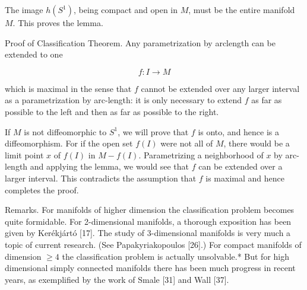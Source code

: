 \documentclass[10pt, letterpaper]{article}
\begin{document}
The image $h\left(S^{1}\right)$, being compact and open in $M$, must be the entire manifold $M$. This proves the lemma.

Proof of Classification Theorem. Any parametrization by arclength can be extended to one

$$
f: I \rightarrow M
$$

which is maximal in the sense that $f$ cannot be extended over any larger interval as a parametrization by arc-length: it is only necessary to extend $f$ as far as possible to the left and then as far as possible to the right.

If $M$ is not diffeomorphic to $S^{1}$, we will prove that $f$ is onto, and hence is a diffeomorphism. For if the open set $f(I)$ were not all of $M$, there would be a limit point $x$ of $f(I)$ in $M-f(I)$. Parametrizing a neighborhood of $x$ by arc-length and applying the lemma, we would see that $f$ can be extended over a larger interval. This contradicts the assumption that $f$ is maximal and hence completes the proof.

Remarks. For manifolds of higher dimension the classification problem becomes quite formidable. For 2-dimensional manifolds, a thorough exposition has been given by Kerékjártó [17]. The study of 3-dimensional manifolds is very much a topic of current research. (See Papakyriakopoulos [26].) For compact manifolds of dimension $\geq 4$ the classification problem is actually unsolvable.* But for high dimensional simply connected manifolds there has been much progress in recent years, as exemplified by the work of Smale [31] and Wall [37].
\end{document}
